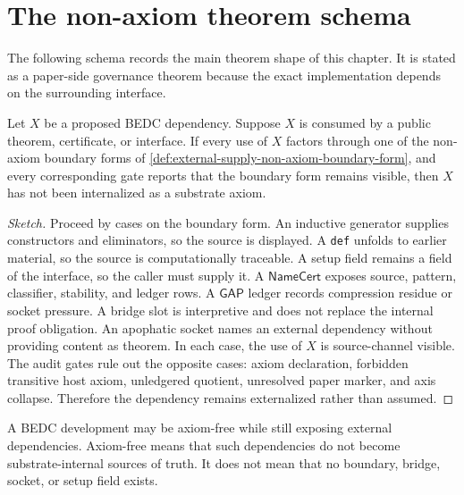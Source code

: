 \section{The non-axiom theorem schema}
\label{sec:external-supply-theorem-schema}

The following schema records the main theorem shape of this chapter. It is stated as a paper-side governance theorem because the exact implementation depends on the surrounding interface.

\begin{theorem}
\label{thm:external-supply-non-axiom-preservation}
Let $X$ be a proposed BEDC dependency. Suppose $X$ is consumed by a public theorem, certificate, or interface. If every use of $X$ factors through one of the non-axiom boundary forms of \autoref{def:external-supply-non-axiom-boundary-form}, and every corresponding gate reports that the boundary form remains visible, then $X$ has not been internalized as a substrate axiom.
\end{theorem}

\begin{proof}[Sketch]
Proceed by cases on the boundary form. An inductive generator supplies constructors and eliminators, so the source is displayed. A \texttt{def} unfolds to earlier material, so the source is computationally traceable. A setup field remains a field of the interface, so the caller must supply it. A $\mathsf{NameCert}$ exposes source, pattern, classifier, stability, and ledger rows. A $\mathsf{GAP}$ ledger records compression residue or socket pressure. A bridge slot is interpretive and does not replace the internal proof obligation. An apophatic socket names an external dependency without providing content as theorem. In each case, the use of $X$ is source-channel visible. The audit gates rule out the opposite cases: axiom declaration, forbidden transitive host axiom, unledgered quotient, unresolved paper marker, and axis collapse. Therefore the dependency remains externalized rather than assumed.
\end{proof}

\begin{corollary}
\label{cor:external-supply-axiomfree-not-dependencefree}
A BEDC development may be axiom-free while still exposing external dependencies. Axiom-free means that such dependencies do not become substrate-internal sources of truth. It does not mean that no boundary, bridge, socket, or setup field exists.
\end{corollary}

